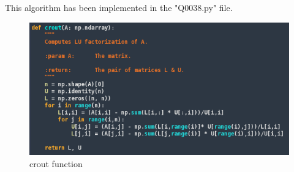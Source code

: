 This algorithm has been implemented in the "Q0038.py" file.
\begin{figure}[ht]
  \includegraphics[width=1\linewidth]{crout}
  \caption{crout function}
\end{figure}
